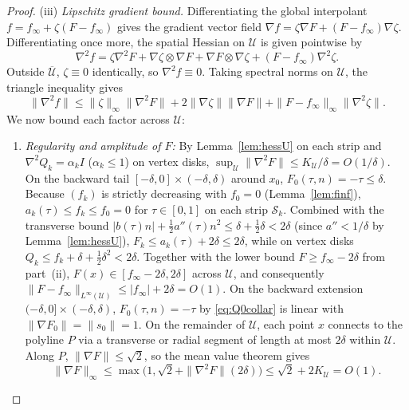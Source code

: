 \documentclass[11pt]{article}
\begin{document}
\begin{proof}
(iii) \emph{Lipschitz gradient bound.}
Differentiating the global interpolant $f = f_\infty + \zeta(F - f_\infty)$ gives the gradient vector field $\nabla f = \zeta \nabla F + (F - f_\infty)\nabla\zeta$.
Differentiating once more, the spatial Hessian on $\mathcal U$ is given pointwise by
\begin{equation}
\label{eq:hess-pointwise}
\nabla^2 f = \zeta \nabla^2 F + \nabla\zeta \otimes \nabla F + \nabla F \otimes \nabla\zeta + (F - f_\infty)\nabla^2\zeta.
\end{equation}
Outside $\overline{\mathcal U}$, $\zeta \equiv 0$ identically, so $\nabla^2 f \equiv 0$.
Taking spectral norms on $\mathcal U$, the triangle inequality gives
\begin{equation}
\label{eq:hess-norm-bound}
\|\nabla^2 f\| \le \|\zeta\|_\infty \|\nabla^2 F\| + 2\|\nabla\zeta\|\|\nabla F\| + \|F - f_\infty\|_\infty \|\nabla^2\zeta\|.
\end{equation}
We now bound each factor across $\mathcal U$:
\begin{enumerate}
\item \emph{Regularity and amplitude of $F$:}
By Lemma~\ref{lem:hessU} on each strip and $\nabla^2 Q_k = \alpha_k I$ ($\alpha_k \le 1$) on vertex disks, $\sup_{\mathcal U}\|\nabla^2 F\| \le K_{\mathcal U}/\delta = O(1/\delta)$.
On the backward tail $[-\delta, 0] \times (-\delta, \delta)$ around $x_0$, $F_0(\tau, n) = -\tau \le \delta$.
Because $(f_k)$ is strictly decreasing with $f_0 = 0$ (Lemma~\ref{lem:finf}), $a_k(\tau) \le f_k \le f_0 = 0$ for $\tau \in [0, 1]$ on each strip $\mathcal S_k$.
Combined with the transverse bound $|b(\tau)n| + \frac12 a''(\tau)n^2 \le \delta + \frac12\delta < 2\delta$ (since $a'' < 1/\delta$ by Lemma~\ref{lem:hessU}), $F_k \le a_k(\tau) + 2\delta \le 2\delta$, while on vertex disks $Q_k \le f_k + \delta + \frac12\delta^2 < 2\delta$.
Together with the lower bound $F \ge f_\infty - 2\delta$ from part~(ii), $F(x) \in [f_\infty - 2\delta, 2\delta]$ across $\mathcal U$, and consequently $\|F - f_\infty\|_{L^\infty(\mathcal U)} \le |f_\infty| + 2\delta = O(1)$.
On the backward extension $(-\delta, 0] \times (-\delta, \delta)$, $F_0(\tau, n) = -\tau$ by \eqref{eq:Q0collar} is linear with $\|\nabla F_0\| = \|s_0\| = 1$.
On the remainder of $\mathcal U$, each point $x$ connects to the polyline $P$ via a transverse or radial segment of length at most $2\delta$ within $\mathcal U$.
Along $P$, $\|\nabla F\| \le \sqrt2$, so the mean value theorem gives
\[
\|\nabla F\|_\infty \le \max\bigl(1, \sqrt2 + \|\nabla^2 F\|(2\delta)\bigr) \le \sqrt2 + 2K_{\mathcal U} = O(1).
\]


\end{enumerate}
\end{proof}
\end{document}

